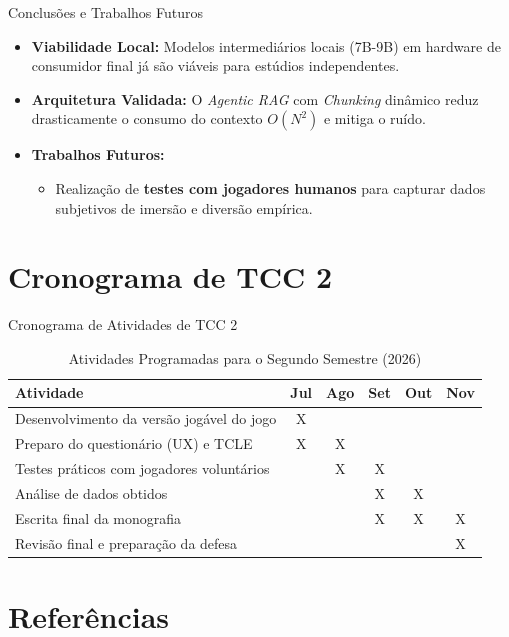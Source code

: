 \documentclass[11pt]{beamer}
\begin{document}
\begin{frame}{Conclusões e Trabalhos Futuros}
\begin{itemize}
    \item \textbf{Viabilidade Local:} Modelos intermediários locais (7B-9B) em hardware de consumidor final já são viáveis para estúdios independentes.
    \item \textbf{Arquitetura Validada:} O \textit{Agentic RAG} com \textit{Chunking} dinâmico reduz drasticamente o consumo do contexto $O(N^2)$ e mitiga o ruído.
    \item \textbf{Trabalhos Futuros:}
    \begin{itemize}
        \item Realização de \textbf{testes com jogadores humanos} para capturar dados subjetivos de imersão e diversão empírica.
    \end{itemize}
\end{itemize}
\end{frame}

\section{Cronograma de TCC 2}

\begin{frame}{Cronograma de Atividades de TCC 2}
\begin{table}[h!]
\centering
\caption{Atividades Programadas para o Segundo Semestre (2026)}
\label{tab:cronograma_tcc2}
\renewcommand{\arraystretch}{1.15}
\scriptsize
\begin{tabular}{|p{5.5cm}|c|c|c|c|c|}
\hline
\textbf{Atividade} & \textbf{Jul} & \textbf{Ago} & \textbf{Set} & \textbf{Out} & \textbf{Nov} \\ \hline
Desenvolvimento da versão jogável do jogo & X & & & & \\ \hline
Preparo do questionário (UX) e TCLE & X & X & & & \\ \hline
Testes práticos com jogadores voluntários & & X & X & & \\ \hline
Análise de dados obtidos & & & X & X & \\ \hline
Escrita final da monografia & & & X & X & X \\ \hline
Revisão final e preparação da defesa & & & & & X \\ \hline
\end{tabular}
\end{table}
\end{frame}

\section{Referências}
\end{document}

